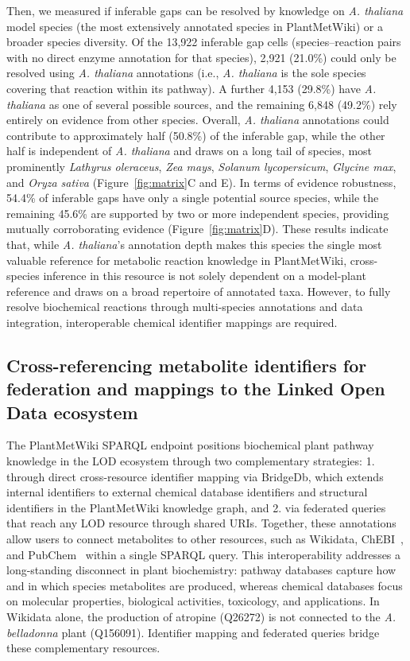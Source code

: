 \documentclass[11pt,a4paper]{article}
\begin{document}
Then, we measured if inferable gaps can be resolved by knowledge on \textit{A. thaliana} model species (the most extensively annotated species in PlantMetWiki) or a broader species diversity. Of the 13,922 inferable gap cells (species--reaction pairs with no direct enzyme
annotation for that species), 2,921 (21.0\%) could only be resolved using \textit{A. thaliana}
annotations (i.e., \textit{A. thaliana} is the sole species covering that reaction within its
pathway). A further 4,153 (29.8\%) have \textit{A. thaliana} as one of several possible sources, and
the remaining 6,848 (49.2\%) rely entirely on evidence from other species. Overall, \textit{A.
thaliana} annotations could contribute to approximately half (50.8\%) of the inferable gap, while the
other half is independent of \textit{A. thaliana} and draws on a long tail of species, most prominently
\textit{Lathyrus oleraceus}, \textit{Zea mays}, \textit{Solanum lycopersicum}, \textit{Glycine max},
and \textit{Oryza sativa} (Figure~\ref{fig:matrix}C and E). In terms of evidence robustness, 54.4\% of
inferable gaps have only a single potential source species, while the remaining 45.6\% are
supported by two or more independent species, providing mutually corroborating evidence (Figure~\ref{fig:matrix}D). These results
indicate that, while \textit{A. thaliana}'s annotation depth makes this species the single most valuable
reference for metabolic reaction knowledge in PlantMetWiki, cross-species inference in this resource is not solely dependent on
a model-plant reference and draws on a broad repertoire of annotated taxa. However, to fully resolve biochemical reactions through multi-species annotations and data integration, interoperable chemical identifier mappings are required.

\subsection*{Cross-referencing metabolite identifiers for federation and mappings to the Linked Open Data ecosystem}

The PlantMetWiki SPARQL endpoint positions biochemical plant pathway knowledge in the LOD ecosystem through
two complementary strategies: 1. through direct cross-resource identifier mapping via BridgeDb, which
extends internal identifiers to external chemical database identifiers and structural identifiers in the PlantMetWiki knowledge graph, and 2. via
federated queries that reach any LOD resource through shared URIs. Together, these annotations allow users to connect metabolites to other
resources, such as Wikidata, ChEBI~\cite{malik2026}, and PubChem~\cite{kim2025} within a single
SPARQL query. This
interoperability addresses a long-standing disconnect in plant biochemistry: pathway databases
capture how and in which species metabolites are produced, whereas chemical databases focus on
molecular properties, biological activities, toxicology, and applications. In Wikidata alone, the
production of atropine (Q26272) is not connected to the \textit{A. belladonna} plant (Q156091). Identifier mapping and federated queries bridge these complementary resources. 
\end{document}
